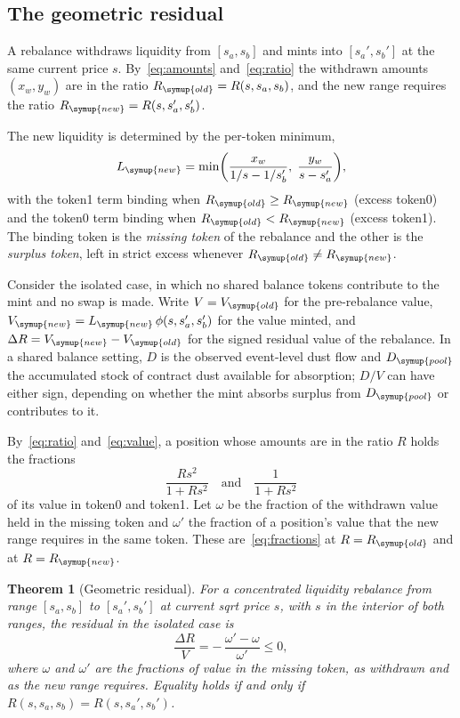 \documentclass[11pt,a4paper]{article}
\theoremstyle{siphon}
\newtheorem{theorem}{Theorem}
\begin{document}
\subsection{The geometric residual}\label{sec:residual}

A rebalance withdraws liquidity from $[s_a, s_b]$ and mints into $[s_a', s_b']$ at the same current price $s$. By~\eqref{eq:amounts} and~\eqref{eq:ratio} the withdrawn amounts $(x_w, y_w)$ are in the ratio $R_{\symup{old}} = R(s, s_a, s_b)$, and the new range requires the ratio $R_{\symup{new}} = R(s, s_a', s_b')$.

The new liquidity is determined by the per-token minimum,
\begin{equation}\label{eq:lnew-min}
L_{\symup{new}} = \min\biggl(\frac{x_w}{1/s - 1/s_b'}, \; \frac{y_w}{s - s_a'}\biggr),
\end{equation}
with the token1 term binding when $R_{\symup{old}} \geq R_{\symup{new}}$ (excess token0) and the token0 term binding when $R_{\symup{old}} < R_{\symup{new}}$ (excess token1). The binding token is the \emph{missing token} of the rebalance and the other is the \emph{surplus token}, left in strict excess whenever $R_{\symup{old}} \neq R_{\symup{new}}$.

Consider the isolated case, in which no shared balance tokens contribute to the mint and no swap is made. Write $V = V_{\symup{old}}$ for the pre-rebalance value, $V_{\symup{new}} = L_{\symup{new}}\,\phi(s, s_a', s_b')$ for the value minted, and $\Delta R = V_{\symup{new}} - V_{\symup{old}}$ for the signed residual value of the rebalance. In a shared balance setting, $D$ is the observed event-level dust flow and $D_{\symup{pool}}$ the accumulated stock of contract dust available for absorption; $D/V$ can have either sign, depending on whether the mint absorbs surplus from $D_{\symup{pool}}$ or contributes to it.

By~\eqref{eq:ratio} and~\eqref{eq:value}, a position whose amounts are in the ratio $R$ holds the fractions
\begin{equation}\label{eq:fractions}
\frac{R s^2}{1 + R s^2} \quad\text{and}\quad \frac{1}{1 + R s^2}
\end{equation}
of its value in token0 and token1. Let $\omega$ be the fraction of the withdrawn value held in the missing token and $\omega'$ the fraction of a position's value that the new range requires in the same token. These are~\eqref{eq:fractions} at $R = R_{\symup{old}}$ and at $R = R_{\symup{new}}$.

\begin{theorem}[Geometric residual]\label{thm:residual}
For a concentrated liquidity rebalance from range $[s_a, s_b]$ to $[s_a', s_b']$ at current sqrt price $s$, with $s$ in the interior of both ranges, the residual in the isolated case is
\begin{equation}\label{eq:share}
\frac{\Delta R}{V} = -\,\frac{\omega' - \omega}{\omega'} \leq 0,
\end{equation}
where $\omega$ and $\omega'$ are the fractions of value in the missing token, as withdrawn and as the new range requires. Equality holds if and only if $R(s, s_a, s_b) = R(s, s_a', s_b')$.
\end{theorem}
\end{document}
